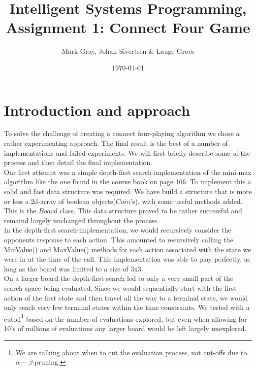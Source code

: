 \documentclass[11pt, a4paper]{article}
\author{Mark Gray, Johan Sivertsen \& Lauge Groes}
\title{Intelligent Systems Programming, Assignment 1: Connect Four Game}
\date{\today}
\begin{document}
\maketitle
\newpage
\section*{Introduction and approach}

To solve the challenge of creating a connect four-playing algorithm we chose a rather experimenting approach. The final result is the best of a number of implementations and failed experiments. We will first briefly describe some of the process and then detail the final implementation.\\

Our first attempt was a simple depth-first search-implementation of the
mini-max algorithm like the one found in the course book on page 166. To implement this a solid and fast data structure was required. We have build a structure that is more or less a 2d-array of boolean objects($Coin$'s), with some useful methods added. This is the $Board$ class. This data structure proved to be rather successful and remaind largely unchanged throughout the process.\\ 

In the depth-first search-implementation, we would recursively consider the
opponents response to each action. This amounted to recursively calling the MinValue()
and MaxValue() methods for each action associated with the state we were in at the time
of the call. This implementation was able to play perfectly, as long as the board was limited to a size of 3x3.\\

On a larger board the depth-first search led to only a very small part of the search space being
evaluated. Since we would sequentially start with the first action of the first
state and then travel all the way to a terminal state, we would only reach very few terminal states within the time constraints. We tested with a cutoff\footnote{We are talking about when to cut the evaluation process, not cut-offs due to $\alpha-\beta$-pruning.} based on the number of evaluations explored, but even when allowing for 10's of millions of evaluations any larger board would be left largely unexplored.\\
\end{document}
